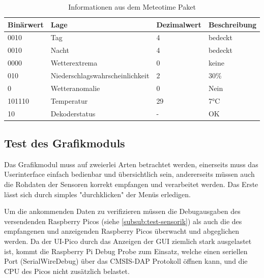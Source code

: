 \documentclass[a4paper,11pt]{article}
\begin{document}
\begin{table}[H]
  \centering
  \begin{tabular}{|l|l|l|l|}
  \hline
  \textbf{Binärwert} & \textbf{Lage}                   & \textbf{Dezimalwert} & \textbf{Beschreibung} \\ \hline
  0010               & Tag                             & 4                    & bedeckt               \\ \hline
  0010               & Nacht                           & 4                    & bedeckt               \\ \hline
  0000               & Wetterextrema                   & 0                    & keine                 \\ \hline
  010                & Niederschlagswahrscheinlichkeit & 2                    & 30\%                  \\ \hline
  0                  & Wetteranomalie                  & 0                    & Nein                  \\ \hline
  101110             & Temperatur                      & 29                   & 7°C                   \\ \hline
  10                 & Dekoderstatus                   & -                    & OK                    \\ \hline
  \end{tabular}
  \caption{Informationen aus dem Meteotime Paket}
  \label{tab:meteopacket}
  \end{table}

\subsection{Test des Grafikmoduls}
Das Grafikmodul muss auf zweierlei Arten betrachtet werden, einerseits muss das Userinterface einfach bedienbar und übersichtlich sein, andererseits müssen auch die Rohdaten der Sensoren korrekt empfangen und verarbeitet werden. Das Erste lässt sich durch simples "durchklicken" der Menüs erledigen.

\vspace{0.2cm}
\noindent
Um die ankommenden Daten zu verifizieren müssen die Debugausgaben des versendenden Raspberry Picos (siehe \ref{subsub:test-sensorik}) als auch die des empfangenen und anzeigenden Raspberry Picos überwacht und abgeglichen werden.
Da der UI-Pico durch das Anzeigen der GUI ziemlich stark ausgelastet ist, kommt die Raspberry Pi Debug Probe zum Einsatz, welche einen seriellen Port (SerialWireDebug) über das CMSIS-DAP Protokoll öffnen kann, und die CPU des Picos nicht zusätzlich belastet.
\end{document}
